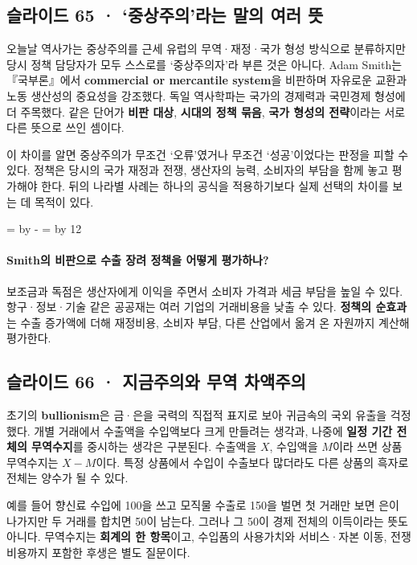 \documentclass[10pt,a4paper]{article}
\newcommand{\ReserveQuestionSpace}{%
  \par\begingroup
  \dimen0=\pagegoal \advance\dimen0 by -\pagetotal
  \dimen2=\baselineskip \multiply\dimen2 by 12
  \ifdim\dimen0<\dimen2 \newpage\fi
  \endgroup}
\begin{document}
\subsection{슬라이드 65 · ‘중상주의’라는 말의 여러 뜻}
오늘날 역사가는 중상주의를 근세 유럽의 무역·재정·국가 형성 방식으로 분류하지만 당시 정책 담당자가 모두 스스로를 ‘중상주의자’라 부른 것은 아니다. Adam Smith는 『국부론』에서 \textbf{commercial or mercantile system}을 비판하며 자유로운 교환과 노동 생산성의 중요성을 강조했다. 독일 역사학파는 국가의 경제력과 국민경제 형성에 더 주목했다. 같은 단어가 \textbf{비판 대상}, \textbf{시대의 정책 묶음}, \textbf{국가 형성의 전략}이라는 서로 다른 뜻으로 쓰인 셈이다.\par

이 차이를 알면 중상주의가 무조건 ‘오류’였거나 무조건 ‘성공’이었다는 판정을 피할 수 있다. 정책은 당시의 국가 재정과 전쟁, 생산자의 능력, 소비자의 부담을 함께 놓고 평가해야 한다. 뒤의 나라별 사례는 하나의 공식을 적용하기보다 실제 선택의 차이를 보는 데 목적이 있다.\par

\ReserveQuestionSpace
\paragraph{Smith의 비판으로 수출 장려 정책을 어떻게 평가하나?}
보조금과 독점은 생산자에게 이익을 주면서 소비자 가격과 세금 부담을 높일 수 있다. 항구·정보·기술 같은 공공재는 여러 기업의 거래비용을 낮출 수 있다. \textbf{정책의 순효과}는 수출 증가액에 더해 재정비용, 소비자 부담, 다른 산업에서 옮겨 온 자원까지 계산해 평가한다.\par

\subsection{슬라이드 66 · 지금주의와 무역 차액주의}
초기의 \textbf{bullionism}은 금·은을 국력의 직접적 표지로 보아 귀금속의 국외 유출을 걱정했다. 개별 거래에서 수출액을 수입액보다 크게 만들려는 생각과, 나중에 \textbf{일정 기간 전체의 무역수지}를 중시하는 생각은 구분된다. 수출액을 $X$, 수입액을 $M$이라 쓰면 상품 무역수지는 $X-M$이다. 특정 상품에서 수입이 수출보다 많더라도 다른 상품의 흑자로 전체는 양수가 될 수 있다.\par

예를 들어 향신료 수입에 100을 쓰고 모직물 수출로 150을 벌면 첫 거래만 보면 은이 나가지만 두 거래를 합치면 50이 남는다. 그러나 그 50이 경제 전체의 이득이라는 뜻도 아니다. 무역수지는 \textbf{회계의 한 항목}이고, 수입품의 사용가치와 서비스·자본 이동, 전쟁 비용까지 포함한 후생은 별도 질문이다.\par
\end{document}
